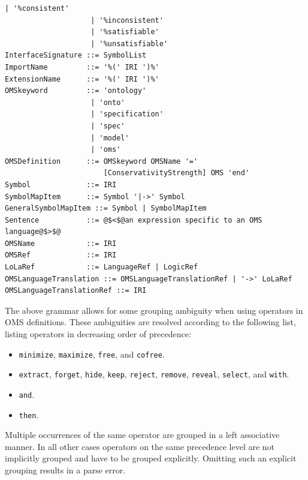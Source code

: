\documentclass[10pt, a4paper]{isov2}
\newcommand*{\syntax}[1]{\texttt{#1}}
\begin{document}
\begin{lstlisting}[language=ebnf,escapeinside={@@},mathescape]
                    | '%consistent'
                    | '%inconsistent'
                    | '%satisfiable'
                    | '%unsatisfiable'
InterfaceSignature ::= SymbolList
ImportName         ::= '%(' IRI ')%'
ExtensionName      ::= '%(' IRI ')%'
OMSkeyword         ::= 'ontology'
                    | 'onto'
                    | 'specification'
                    | 'spec'
                    | 'model'
                    | 'oms'
OMSDefinition      ::= OMSkeyword OMSName '='
                       [ConservativityStrength] OMS 'end'
Symbol             ::= IRI
SymbolMapItem      ::= Symbol '|->' Symbol
GeneralSymbolMapItem ::= Symbol | SymbolMapItem
Sentence           ::= @$<$@an expression specific to an OMS language@$>$@
OMSName            ::= IRI
OMSRef             ::= IRI
LoLaRef            ::= LanguageRef | LogicRef
OMSLanguageTranslation ::= OMSLanguageTranslationRef | '->' LoLaRef
OMSLanguageTranslationRef ::= IRI
\end{lstlisting}




The above grammar allows for some grouping ambiguity when using operators in
OMS definitions. These ambiguities are resolved according to the following
list, listing operators in decreasing order of precedence:
\begin{itemize}[noitemsep]
  \item \syntax{minimize}, \syntax{maximize}, \syntax{free}, and \syntax{cofree}.
  \item \syntax{extract}, \syntax{forget}, \syntax{hide}, \syntax{keep},
    \syntax{reject}, \syntax{remove}, \syntax{reveal}, \syntax{select}, and
    \syntax{with}.
  \item \syntax{and}.
  \item \syntax{then}.
\end{itemize}
Multiple occurrences of the same operator are grouped in a left associative
manner. In all other cases operators on the same precedence level are not
implicitly grouped and have to be grouped explicitly. Omitting such an explicit
grouping results in a parse error.

\end{document}
